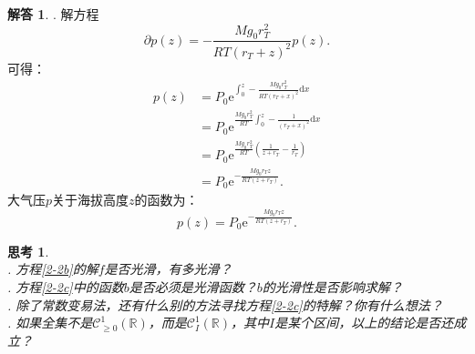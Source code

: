 \documentclass[12pt,UTF8]{ctexbook}
\newcommand{\e}{\mathrm{e}}
\theoremstyle{definition}
\newtheorem*{so}{解答}
\theoremstyle{plain}
\newtheorem{sk}{思考}[section]
\begin{document}
\begin{so}
    . 解方程
    $$ \partial p(z) = -\frac{Mg_0r_T^2}{RT(r_T + z)^2} p(z). $$
    可得：
    \begin{align*}
        p(z) &= P_0\e^{\int_0^z -\frac{Mg_0r_T^2}{RT(r_T + x)^2}\mathrm{d}x} \\
        &= P_0\e^{\frac{Mg_0r_T^2}{RT}\int_0^z -\frac{1}{(r_T + x)^2}\mathrm{d}x} \\
        &= P_0\e^{\frac{Mg_0r_T^2}{RT}\left(\frac{1}{z + r_T} - \frac{1}{r_T}\right)} \\
        &= P_0\e^{-\frac{Mg_0r_Tz}{RT(z + r_T)}}.
    \end{align*}
    大气压$p$关于海拔高度$z$的函数为：
    $$ p(z) = P_0 \e^{-\frac{Mg_0r_Tz}{RT(z + r_T)}} . $$

\end{so}

\begin{sk}
    \mbox{} \\
    . 方程\eqref{2-2b}的解$f$是否光滑，有多光滑？\\
    . 方程\eqref{2-2c}中的函数$b$是否必须是光滑函数？$b$的光滑性是否影响求解？\\
    . 除了常数变易法，还有什么别的方法寻找方程\eqref{2-2c}的特解？你有什么想法？\\
    . 如果全集不是$\mathcal{C}^1_{\geqslant 0}(\mathbb{R})$，而是$\mathcal{C}^1_I(\mathbb{R})$，其中$I$是某个区间，以上的结论是否还成立？
    
\end{sk}
\end{document}

